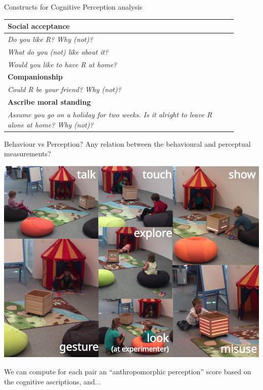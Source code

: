 \documentclass[compress]{beamer}
\begin{document}
{\begin{frame}{Constructs for Cognitive Perception analysis}
\begin{multicols}{2}
\begin{table}[]
\begin{tabularx}{\linewidth}{p{0.9\linewidth}}
    \toprule
    {\bf Social acceptance} \tabularnewline
    \midrule


    \emph{Do you like R? Why (not)?} \tabularnewline
    \emph{What do you (not) like about it?} \tabularnewline
    \emph{Would you like to have R at home?} \tabularnewline

    \toprule
    {\bf Companionship} \tabularnewline
    \midrule


    \emph{Could R be your friend? Why (not)?}\tabularnewline

    \toprule
    {\bf Ascribe moral standing} \tabularnewline
    \midrule


    \emph{Assume you go on a holiday for two weeks. Is it alright to leave R
    alone at home? Why (not)?} \tabularnewline


            \bottomrule
        \end{tabularx}
        \label{tab:options}
    \end{table}
    \end{multicols}

\end{frame}
}


{

\begin{frame}{Behaviour vs Perception?}
    \centering
    Any relation between the behavioural and perceptual measurements?

    \includegraphics[width=0.5\linewidth]{ranger/interactions}

    We can compute for each pair an ``anthropomorphic perception'' score based on
    the cognitive ascriptions, and...
\end{frame}

}
\end{document}
